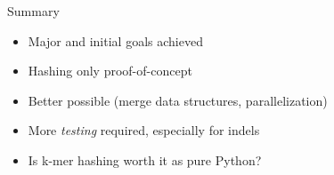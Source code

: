 \documentclass[nenglish]{beamer}
\begin{document}
\begin{frame}{Summary}
\begin{itemize}
 \itemsep0.3cm
 \item Major and initial goals achieved
 \item Hashing only proof-of-concept
 \item Better possible (merge data structures, parallelization)
 \item More \emph{testing} required, especially for indels
 \item Is k-mer hashing worth it as pure Python?
\end{itemize}
\end{frame}
\end{document}
